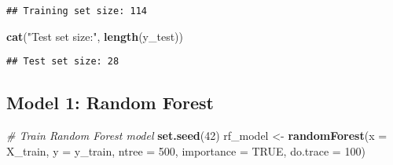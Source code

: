 \documentclass[
]{article}
\newenvironment{Shaded}{\begin{snugshade}}{\end{snugshade}}
\newcommand{\AttributeTok}[1]{\textcolor[rgb]{0.13,0.29,0.53}{#1}}
\newcommand{\CommentTok}[1]{\textcolor[rgb]{0.56,0.35,0.01}{\textit{#1}}}
\newcommand{\ConstantTok}[1]{\textcolor[rgb]{0.56,0.35,0.01}{#1}}
\newcommand{\DecValTok}[1]{\textcolor[rgb]{0.00,0.00,0.81}{#1}}
\newcommand{\FloatTok}[1]{\textcolor[rgb]{0.00,0.00,0.81}{#1}}
\newcommand{\FunctionTok}[1]{\textcolor[rgb]{0.13,0.29,0.53}{\textbf{#1}}}
\newcommand{\NormalTok}[1]{#1}
\newcommand{\OtherTok}[1]{\textcolor[rgb]{0.56,0.35,0.01}{#1}}
\newcommand{\SpecialCharTok}[1]{\textcolor[rgb]{0.81,0.36,0.00}{\textbf{#1}}}
\newcommand{\StringTok}[1]{\textcolor[rgb]{0.31,0.60,0.02}{#1}}
\begin{document}
\begin{Shaded}
\end{Shaded}

\begin{verbatim}
## Training set size: 114
\end{verbatim}

\begin{Shaded}
\begin{Highlighting}[]
\FunctionTok{cat}\NormalTok{(}\StringTok{"Test set size:"}\NormalTok{, }\FunctionTok{length}\NormalTok{(y\_test))}
\end{Highlighting}
\end{Shaded}

\begin{verbatim}
## Test set size: 28
\end{verbatim}

\subsection{Model 1: Random Forest}\label{model-1-random-forest}

\begin{Shaded}
\begin{Highlighting}[]
\CommentTok{\# Train Random Forest model}
\FunctionTok{set.seed}\NormalTok{(}\DecValTok{42}\NormalTok{)}
\NormalTok{rf\_model }\OtherTok{\textless{}{-}} \FunctionTok{randomForest}\NormalTok{(}\AttributeTok{x =}\NormalTok{ X\_train, }\AttributeTok{y =}\NormalTok{ y\_train, }
                        \AttributeTok{ntree =} \DecValTok{500}\NormalTok{, }
                        \AttributeTok{importance =} \ConstantTok{TRUE}\NormalTok{,}
                        \AttributeTok{do.trace =} \DecValTok{100}\NormalTok{)}
\end{Highlighting}
\end{Shaded}
\end{document}
